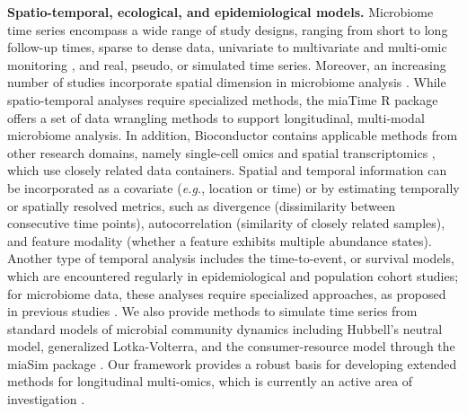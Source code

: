 \documentclass[
  sn-nature,
]{sn-jnl}
\begin{document}
\textbf{Spatio-temporal, ecological, and epidemiological models.}
Microbiome time series \citep{berg2020} encompass a wide range of study
designs, ranging from short to long follow-up times, sparse to dense
data, univariate to multivariate and multi-omic monitoring
\citep{velten2022}, and real, pseudo, or simulated time series.
Moreover, an increasing number of studies incorporate spatial dimension
in microbiome analysis \citep{ruuskanen2021}. While spatio-temporal
analyses require specialized methods, the miaTime R package offers a set
of data wrangling methods to support longitudinal, multi-modal
microbiome analysis. In addition, Bioconductor contains applicable
methods from other research domains, namely single-cell omics
\citep{amezquita2020} and spatial transcriptomics \citep{crowell2025},
which use closely related data containers. Spatial and temporal
information can be incorporated as a covariate (\emph{e.g.}, location or
time) or by estimating temporally or spatially resolved metrics, such as
divergence (dissimilarity between consecutive time points),
autocorrelation (similarity of closely related samples), and feature
modality (whether a feature exhibits multiple abundance states). Another
type of temporal analysis includes the time-to-event, or survival
models, which are encountered regularly in epidemiological and
population cohort studies; for microbiome data, these analyses require
specialized approaches, as proposed in previous studies
\citep{salosensaari2021, calle2023}. We also provide methods to simulate
time series from standard models of microbial community dynamics
including Hubbell's neutral model, generalized Lotka-Volterra, and the
consumer-resource model through the miaSim package \citep{gao2023}. Our
framework provides a robust basis for developing extended methods for
longitudinal multi-omics, which is currently an active area of
investigation \citep{sherwani2025}.
\end{document}
